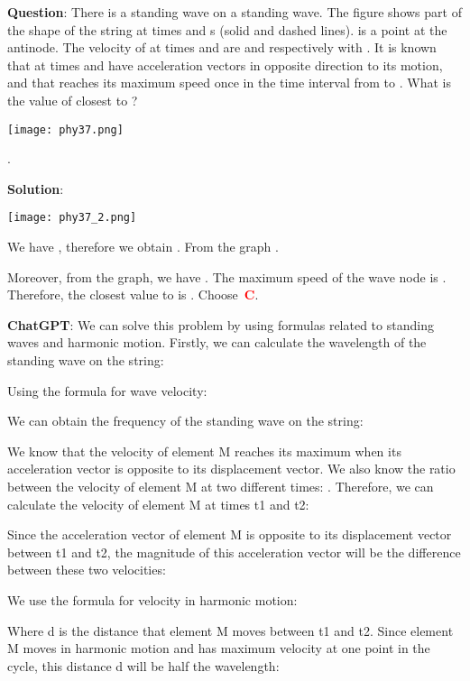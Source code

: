 \documentclass{article}
\begin{document}
{	
	\begin{mdframed}[linewidth=1pt,linecolor=red] \textbf{Question}: There is a standing wave on a standing wave. The figure shows part of the shape of the string at times  and  s (solid and dashed lines).  is a point at the antinode. The velocity of  at times  and  are  and  respectively with . It is known that  at times  and  have acceleration vectors in opposite direction to its motion, and that  reaches its maximum speed  once in the time interval from  to . What is the value of  closest to ?
		
		\texttt{[image: phy37.png]}
		
		\begin{oneparchoices}
			\choice 
			\choice .
			\choice 
			\choice 
		\end{oneparchoices}
		
		\textbf{Solution}: 
		
		\texttt{[image: phy37\_2.png]}
		
		We have , therefore we obtain 
		. From the graph 
		. 
		
		Moreover, from the graph, we have
		. 
		The maximum speed of the wave node is . 	Therefore, the closest value to  is . Choose~\textcolor{red}{\textbf{C}}.
		
		\textbf{ChatGPT}: We can solve this problem by using formulas related to standing waves and harmonic motion. Firstly, we can calculate the wavelength of the standing wave on the string:
		
		Using the formula for wave velocity:
		
		We can obtain the frequency of the standing wave on the string:
		
		We know that the velocity of element M reaches its maximum when its acceleration vector is opposite to its displacement vector. We also know the ratio between the velocity of element M at two different times:
		. Therefore, we can calculate the velocity of element M at times t1 and t2:
		
		
		Since the acceleration vector of element M is opposite to its displacement vector between t1 and t2, the magnitude of this acceleration vector will be the difference between these two velocities:
		
		We use the formula for velocity in harmonic motion:
		
		Where d is the distance that element M moves between t1 and t2. Since element M moves in harmonic motion and has maximum velocity at one point in the cycle, this distance d will be half the wavelength:
		

\end{mdframed}}
\end{document}

